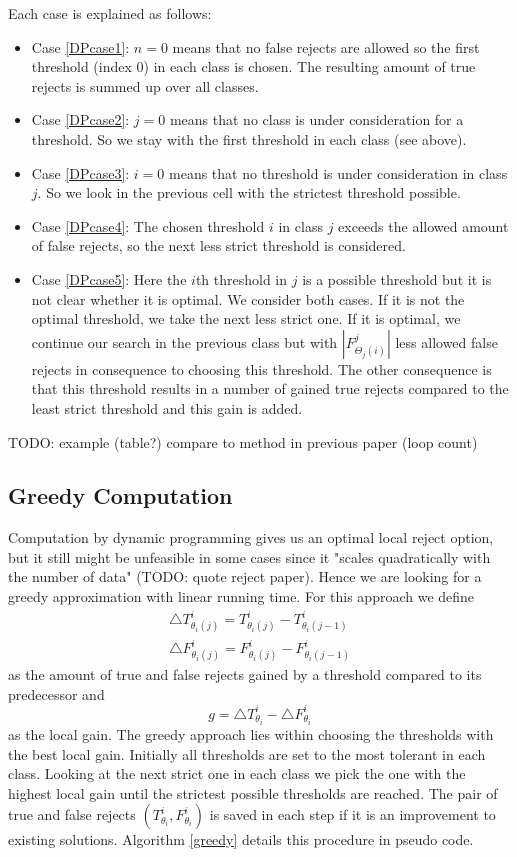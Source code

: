 Each case is explained as follows:
\begin{itemize}
\item Case \ref{DPcase1}: $n=0$ means that no false rejects are allowed so the first threshold (index 0) in each class is chosen. The resulting amount of true rejects is summed up over all classes.
\item Case \ref{DPcase2}: $j=0$ means that no class is under consideration for a threshold. So we stay with the first threshold in each class (see above). 
\item Case \ref{DPcase3}: $i=0$ means that no threshold is under consideration in class $j$. So we look in the previous cell with the strictest threshold possible.
\item Case \ref{DPcase4}: The chosen threshold $i$ in class $j$ exceeds the allowed amount of false rejects, so the next less strict threshold is considered.
\item Case \ref{DPcase5}: Here the $i$th threshold in $j$ is a possible threshold but it is not clear whether it is optimal. We consider both cases. If it is not the optimal threshold, we take the next less strict one. If it is optimal, we continue our search in the previous class but with $|F_{\Theta_j(i)}^j|$ less allowed false rejects in consequence to choosing this threshold. The other consequence is that this threshold results in a number of gained true rejects compared to the least strict threshold and this gain is added.
\end{itemize}
TODO: example (table?) compare to method in previous paper (loop count)

\subsection{Greedy Computation}
Computation by dynamic programming gives us an optimal local reject option, but it still might be unfeasible in some cases since it "scales quadratically with the number of data" (TODO: quote reject paper). Hence we are looking for a greedy approximation with linear running time. For this approach we define
\begin{align}
 	\bigtriangleup T_{\theta_i(j)}^i = T_{\theta_i(j)}^i-T_{\theta_i(j-1)}^i \\
	\bigtriangleup F_{\theta_i(j)}^i = F_{\theta_i(j)}^i-F_{\theta_i(j-1)}^i
\end{align}
as the amount of true and false rejects gained by a threshold compared to its predecessor and
$$ g = \bigtriangleup T_{\theta_i}^i - \bigtriangleup F_{\theta_i}^i $$
as the local gain. The greedy approach lies within choosing the thresholds with the best local gain. Initially all thresholds are set to the most tolerant in each class. Looking at the next strict one in each class we pick the one with the highest local gain until the strictest possible thresholds are reached. The pair of true and false rejects $\left(T_{\theta_i}^i,F_{\theta_i}^i\right)$ is saved in each step if it is an improvement to existing solutions. Algorithm \ref{greedy} details this procedure in pseudo code. 

